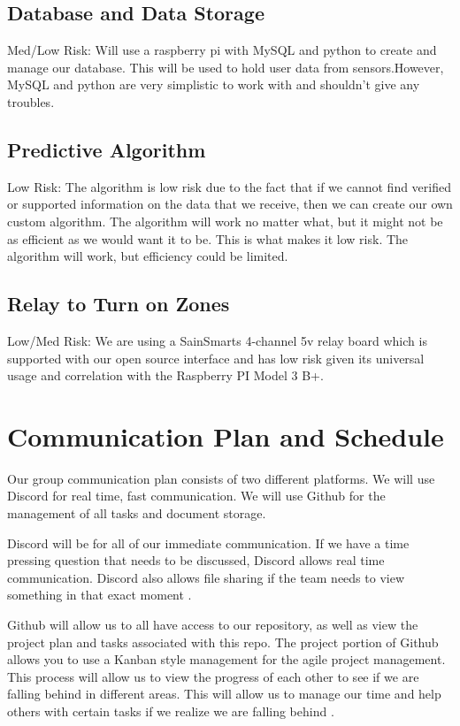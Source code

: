 \documentclass[letterpaper, 10 pt, conference]{ieeeconf}  %
\begin{document}
\subsection{Database and Data Storage}
Med/Low Risk: Will use a raspberry pi with MySQL and python to create and manage our database. This will be used to hold user data from sensors.However, MySQL and python are very simplistic to work with and shouldn't give any troubles.

\subsection{Predictive Algorithm}
Low Risk: The algorithm is low risk due to the fact that if we cannot find verified or supported information on the data that we receive, then we can create our own custom algorithm. The algorithm will work no matter what, but it might not be as efficient as we would want it to be. This is what makes it low risk. The algorithm will work, but efficiency could be limited.

\subsection{Relay to Turn on Zones}
Low/Med Risk: We are using a SainSmarts 4-channel 5v relay board which is supported with our open source interface and has low risk given its universal usage and correlation with the Raspberry PI Model 3 B+.

\section{Communication Plan and Schedule}
Our group communication plan consists of two different platforms. We will use Discord for real time, fast communication. We will use Github for the management of all tasks and document storage. 

Discord will be for all of our immediate communication. If we have a time pressing question that needs to be discussed, Discord allows real time communication. Discord also allows file sharing if the team needs to view something in that exact moment \cite{discord}.

Github will allow us to all have access to our repository, as well as view the project plan and tasks associated with this repo. The project portion of Github allows you to use a Kanban style management for the agile project management. This process will allow us to view the progress of each other to see if we are falling behind in different areas. This will allow us to manage our time and help others with certain tasks if we realize we are falling behind \cite{github}. 
\end{document}
